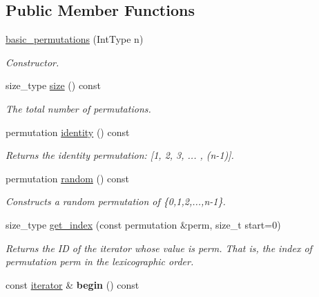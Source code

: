 \subsection*{Public Member Functions}
\begin{DoxyCompactItemize}
\item 
\hyperlink{classdscr_1_1basic__permutations_af32a55eb7b8374b977a85af224fed68b}{basic\-\_\-permutations} (Int\-Type n)
\begin{DoxyCompactList}\small\item\em Constructor. \end{DoxyCompactList}\item 
size\-\_\-type \hyperlink{classdscr_1_1basic__permutations_a3708aa7e2fafd45c5c40c0470f8562a0}{size} () const 
\begin{DoxyCompactList}\small\item\em The total number of permutations. \end{DoxyCompactList}\item 
permutation \hyperlink{classdscr_1_1basic__permutations_ae99f68b50be24565cd38dbd0040d5cd9}{identity} () const 
\begin{DoxyCompactList}\small\item\em Returns the identity permutation\-: \mbox{[}1, 2, 3, ... , (n-\/1)\mbox{]}. \end{DoxyCompactList}\item 
\hypertarget{classdscr_1_1basic__permutations_abe586c609d61d40e6167923d0a208986}{permutation \hyperlink{classdscr_1_1basic__permutations_abe586c609d61d40e6167923d0a208986}{random} () const }\label{classdscr_1_1basic__permutations_abe586c609d61d40e6167923d0a208986}

\begin{DoxyCompactList}\small\item\em Constructs a random permutation of \{0,1,2,...,n-\/1\}. \end{DoxyCompactList}\item 
size\-\_\-type \hyperlink{classdscr_1_1basic__permutations_a334c7b5ba69d40907247e37524b1b243}{get\-\_\-index} (const permutation \&perm, size\-\_\-t start=0)
\begin{DoxyCompactList}\small\item\em Returns the I\-D of the iterator whose value is perm. That is, the index of permutation perm in the lexicographic order. \end{DoxyCompactList}\item 
\hypertarget{classdscr_1_1basic__permutations_a03951d52ff98e62219c92d3d6c786452}{const \hyperlink{classdscr_1_1basic__permutations_1_1iterator}{iterator} \& {\bfseries begin} () const }\label{classdscr_1_1basic__permutations_a03951d52ff98e62219c92d3d6c786452}


\end{DoxyCompactItemize}
